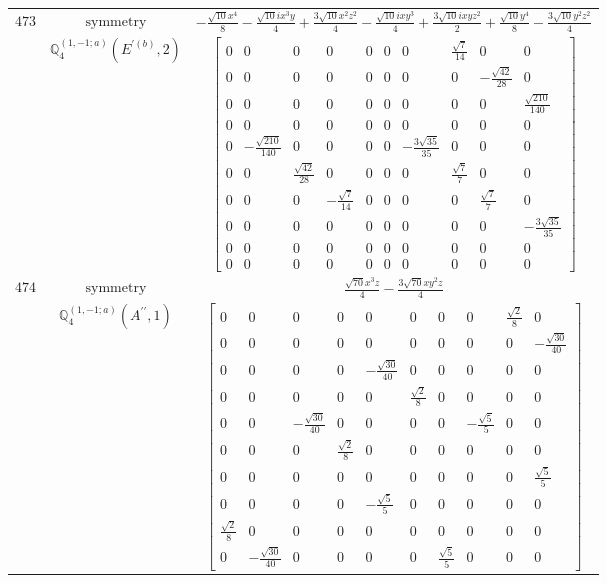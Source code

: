 \documentclass[fleqn,8pt,landscape]{jsarticle}
\begin{document}
\begin{longtable}{ccc}
$ 473 $ & $ \text{symmetry} $ & $ - \frac{\sqrt{10} x^{4}}{8} - \frac{\sqrt{10} i x^{3} y}{4} + \frac{3 \sqrt{10} x^{2} z^{2}}{4} - \frac{\sqrt{10} i x y^{3}}{4} + \frac{3 \sqrt{10} i x y z^{2}}{2} + \frac{\sqrt{10} y^{4}}{8} - \frac{3 \sqrt{10} y^{2} z^{2}}{4} $ \\
$  $ & $ \mathbb{Q}_{4}^{(1,-1;a)}(E^{\prime(b)},2) $ & $ \begin{bmatrix} 0 & 0 & 0 & 0 & 0 & 0 & 0 & \frac{\sqrt{7}}{14} & 0 & 0 \\ 0 & 0 & 0 & 0 & 0 & 0 & 0 & 0 & - \frac{\sqrt{42}}{28} & 0 \\ 0 & 0 & 0 & 0 & 0 & 0 & 0 & 0 & 0 & \frac{\sqrt{210}}{140} \\ 0 & 0 & 0 & 0 & 0 & 0 & 0 & 0 & 0 & 0 \\ 0 & - \frac{\sqrt{210}}{140} & 0 & 0 & 0 & 0 & - \frac{3 \sqrt{35}}{35} & 0 & 0 & 0 \\ 0 & 0 & \frac{\sqrt{42}}{28} & 0 & 0 & 0 & 0 & \frac{\sqrt{7}}{7} & 0 & 0 \\ 0 & 0 & 0 & - \frac{\sqrt{7}}{14} & 0 & 0 & 0 & 0 & \frac{\sqrt{7}}{7} & 0 \\ 0 & 0 & 0 & 0 & 0 & 0 & 0 & 0 & 0 & - \frac{3 \sqrt{35}}{35} \\ 0 & 0 & 0 & 0 & 0 & 0 & 0 & 0 & 0 & 0 \\ 0 & 0 & 0 & 0 & 0 & 0 & 0 & 0 & 0 & 0 \end{bmatrix} $ \\ \hline
$ 474 $ & $ \text{symmetry} $ & $ \frac{\sqrt{70} x^{3} z}{4} - \frac{3 \sqrt{70} x y^{2} z}{4} $ \\
$  $ & $ \mathbb{Q}_{4}^{(1,-1;a)}(A^{\prime\prime},1) $ & $ \begin{bmatrix} 0 & 0 & 0 & 0 & 0 & 0 & 0 & 0 & \frac{\sqrt{2}}{8} & 0 \\ 0 & 0 & 0 & 0 & 0 & 0 & 0 & 0 & 0 & - \frac{\sqrt{30}}{40} \\ 0 & 0 & 0 & 0 & - \frac{\sqrt{30}}{40} & 0 & 0 & 0 & 0 & 0 \\ 0 & 0 & 0 & 0 & 0 & \frac{\sqrt{2}}{8} & 0 & 0 & 0 & 0 \\ 0 & 0 & - \frac{\sqrt{30}}{40} & 0 & 0 & 0 & 0 & - \frac{\sqrt{5}}{5} & 0 & 0 \\ 0 & 0 & 0 & \frac{\sqrt{2}}{8} & 0 & 0 & 0 & 0 & 0 & 0 \\ 0 & 0 & 0 & 0 & 0 & 0 & 0 & 0 & 0 & \frac{\sqrt{5}}{5} \\ 0 & 0 & 0 & 0 & - \frac{\sqrt{5}}{5} & 0 & 0 & 0 & 0 & 0 \\ \frac{\sqrt{2}}{8} & 0 & 0 & 0 & 0 & 0 & 0 & 0 & 0 & 0 \\ 0 & - \frac{\sqrt{30}}{40} & 0 & 0 & 0 & 0 & \frac{\sqrt{5}}{5} & 0 & 0 & 0 \end{bmatrix} $ \\ \hline

\end{longtable}
\end{document}
